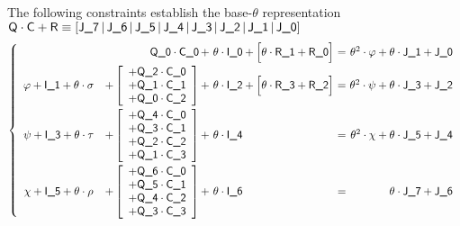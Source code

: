 \noindent The following constraints establish the base-$\theta$ representation
$
\textsf{Q} \cdot \textsf{C} + \textsf{R}
\equiv
[\textsf{J\_7} \,|\, \textsf{J\_6} \,|\, \textsf{J\_5} \,|\, \textsf{J\_4} \,|\, 
\textsf{J\_3} \,|\, \textsf{J\_2} \,|\, \textsf{J\_1} \,|\, \textsf{J\_0}]
$
\[
	\left\{ \begin{array}{crlcr}
		& \col{Q\_0} \cdot \col{C\_0} & \!\!\!\!\! + \,\, \theta \cdot \col{I\_0} + \Big[\theta \cdot \col{R\_1} + \col{R\_0}\Big] & \!\!\!\! = \!\!\!\! & \theta^2 \cdot \varphi + \theta \cdot \col{J\_1} + \col{J\_0} \vspace{1mm} \\
		\varphi + \col{I\_1} + \theta\cdot\sigma & +
		\left[\begin{array}{r}
			+ \col{Q\_2} \cdot \col{C\_0} \\
			+ \col{Q\_1} \cdot \col{C\_1} \\
			+ \col{Q\_0} \cdot \col{C\_2} \\
		\end{array}\right]
		& \!\!\!\!\! + \,\, \theta \cdot \col{I\_2} + \Big[\theta \cdot \col{R\_3} + \col{R\_2}\Big] & \!\!\!\! = \!\!\!\! & \theta^2 \cdot \psi + \theta \cdot \col{J\_3} + \col{J\_2} \vspace{1mm} \\
		\psi + \col{I\_3} + \theta\cdot\tau & \!\!\!\! +
		\left[\begin{array}{r}
			+ \col{Q\_4} \cdot \col{C\_0} \\
			+ \col{Q\_3} \cdot \col{C\_1} \\
			+ \col{Q\_2} \cdot \col{C\_2} \\
			+ \col{Q\_1} \cdot \col{C\_3} \\
		\end{array}\right]
		& \!\!\!\!\! + \,\, \theta \cdot \col{I\_4} & \!\!\!\! = \!\!\!\! & \theta^2 \cdot \chi + \theta \cdot \col{J\_5} + \col{J\_4} \vspace{1mm} \\
		\chi + \col{I\_5} + \theta\cdot\rho & \!\!\!\! +
		\left[\begin{array}{r}
			+ \col{Q\_6} \cdot \col{C\_0} \\
			+ \col{Q\_5} \cdot \col{C\_1} \\
			+ \col{Q\_4} \cdot \col{C\_2} \\
			+ \col{Q\_3} \cdot \col{C\_3} \\
		\end{array}\right]
		& \!\!\!\!\! + \,\, \theta \cdot \col{I\_6} & \!\!\!\! = \!\!\!\! & \theta \cdot \col{J\_7} + \col{J\_6} \\
	\end{array} \right.
	\]
